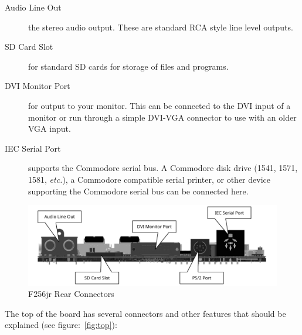 \begin{description}
    \item[Audio Line Out] the stereo audio output. These are standard RCA style line level outputs.

    \item[SD Card Slot] for standard SD cards for storage of files and programs.

    \item[DVI Monitor Port] for output to your monitor. This can be connected to the DVI input of a monitor or run through a simple DVI-VGA connector to use with an older VGA input.

    \item[IEC Serial Port] supports the Commodore serial bus. A Commodore disk drive (1541, 1571, 1581, {\it etc.}), a Commodore compatible serial printer, or other device supporting the Commodore serial bus can be connected here.
\end{description}

\begin{figure}[ht]
    \begin{center}
        \includegraphics[scale=0.75]{images/f256_render_annotated_back.pdf}
    \end{center}
    \caption{F256jr Rear Connectors}
    \label{fig:rear}
\end{figure}

The top of the board has several connectors and other features that should be explained (see figure:~\ref{fig:top}):


